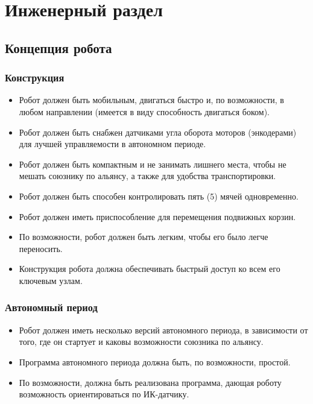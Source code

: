 
\section{Инженерный раздел}
\subsection{Концепция робота}
\subsubsection{Конструкция}
\begin{itemize}
	\item Робот должен быть мобильным, двигаться быстро и, по возможности, в любом направлении (имеется в виду способность двигаться боком).
	\item Робот должен быть снабжен датчиками угла оборота моторов (энкодерами) для лучшей управляемости в автономном периоде.
	\item Робот должен быть компактным и не занимать лишнего места, чтобы не мешать союзнику по альянсу, а также для удобства транспортировки.
	\item Робот должен быть способен контролировать пять (5) мячей одновременно.
	\item Робот должен иметь приспособление для перемещения подвижных корзин.
	\item По возможности, робот должен быть легким, чтобы его было легче переносить.
	\item Конструкция робота должна обеспечивать быстрый доступ ко всем его ключевым узлам.
\end{itemize}
\subsubsection{Автономный период}
\begin{itemize}
	\item Робот должен иметь несколько версий автономного периода, в зависимости от того, где он стартует и каковы возможности союзника по альянсу.
	\item Программа автономного периода должна быть, по возможности, простой.
	\item По возможности, должна быть реализована программа, дающая роботу возможность ориентироваться по ИК-датчику.
\end{itemize}
